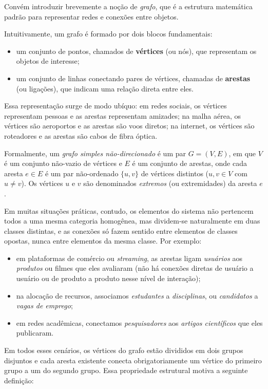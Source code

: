 \documentclass[12pt,portuguese]{article}
\theoremstyle{definition}
\begin{document}
Convém introduzir brevemente a noção de \emph{grafo}, que é a estrutura
matemática padrão para representar redes e conexões entre objetos.

Intuitivamente, um grafo é formado por dois blocos fundamentais:
\begin{itemize}
  \item um conjunto de pontos, chamados de \textbf{vértices} (ou nós), que
  representam os objetos de interesse;
  \item um conjunto de linhas conectando pares de vértices, chamadas de
  \textbf{arestas} (ou ligações), que indicam uma relação direta entre eles.
\end{itemize}
Essa representação surge de modo ubíquo: em redes sociais, os vértices
representam pessoas e as arestas representam amizades; na malha aérea, os
vértices são aeroportos e as arestas são voos diretos; na internet, os vértices
são roteadores e as arestas são cabos de fibra óptica.

Formalmente, um \emph{grafo simples não-direcionado} é um par $G=(V,E)$, em que
$V$ é um conjunto não-vazio de vértices e $E$ é um conjunto de arestas,
onde cada aresta $e\in E$ é um par não-ordenado $\{u,v\}$ de vértices distintos
($u,v\in V$ com $u\neq v$). Os vértices $u$ e $v$ são denominados
\emph{extremos} (ou extremidades) da aresta $e$.

Em muitas situações práticas, contudo, os elementos do sistema não pertencem
todos a uma mesma categoria homogênea, mas dividem-se naturalmente em duas
classes distintas, e as conexões só fazem sentido entre elementos de classes
opostas, nunca entre elementos da mesma classe. Por exemplo:
\begin{itemize}
  \item em plataformas de comércio ou \emph{streaming}, as arestas ligam
  \emph{usuários} aos \emph{produtos} ou filmes que eles avaliaram (não há
  conexões diretas de usuário a usuário ou de produto a produto nesse nível de
  interação);
  \item na alocação de recursos, associamos \emph{estudantes} a
  \emph{disciplinas}, ou \emph{candidatos} a \emph{vagas de emprego};
  \item em redes acadêmicas, conectamos \emph{pesquisadores} aos \emph{artigos
  científicos} que eles publicaram.
\end{itemize}
Em todos esses cenários, os vértices do grafo estão divididos em dois grupos
disjuntos e cada aresta existente conecta obrigatoriamente um vértice do
primeiro grupo a um do segundo grupo. Essa propriedade estrutural motiva a
seguinte definição:
\end{document}
